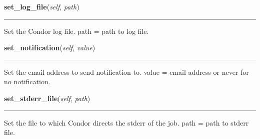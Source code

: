     \noindent\begin{boxedminipage}{\textwidth}

    \raggedright \textbf{set\_log\_file}(\textit{self}, \textit{path})

    \vspace{-1.5ex}

    \rule{\textwidth}{0.5\fboxrule}
    Set the Condor log file. path = path to log file.

    \vspace{1ex}

    \end{boxedminipage}

    \label{pipeline:CondorJob:set_notification}
    \vspace{0.5ex}

    \noindent\begin{boxedminipage}{\textwidth}

    \raggedright \textbf{set\_notification}(\textit{self}, \textit{value})

    \vspace{-1.5ex}

    \rule{\textwidth}{0.5\fboxrule}
    Set the email address to send notification to. value = email address 
    or never for no notification.

    \vspace{1ex}

    \end{boxedminipage}

    \label{pipeline:CondorJob:set_stderr_file}
    \vspace{0.5ex}

    \noindent\begin{boxedminipage}{\textwidth}

    \raggedright \textbf{set\_stderr\_file}(\textit{self}, \textit{path})

    \vspace{-1.5ex}

    \rule{\textwidth}{0.5\fboxrule}
    Set the file to which Condor directs the stderr of the job. path = 
    path to stderr file.

    \vspace{1ex}

    \end{boxedminipage}

